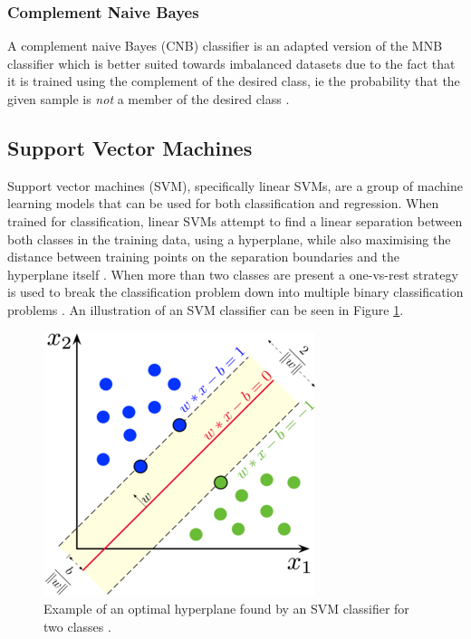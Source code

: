 \subsubsection{Complement Naive Bayes}

A complement naive Bayes (CNB) classifier is an adapted version of the MNB classifier which is better suited towards imbalanced datasets due to the fact that it is trained using the complement of the desired class, ie the probability that the given sample is \textit{not} a member of the desired class \cite{pedregosa2011scikit} \cite{rennie2003tackling}.

\subsection{Support Vector Machines}

Support vector machines (SVM), specifically linear SVMs, are a group of machine learning models that can be used for both classification and regression. When trained for classification, linear SVMs attempt to find a linear separation between both classes in the training data, using a hyperplane, while also maximising the distance between training points on the separation boundaries and the hyperplane itself \cite{dangeti2017statistics}. When more than two classes are present a one-vs-rest strategy is used to break the classification problem down into multiple binary classification problems \cite{pedregosa2011scikit}. An illustration of an SVM classifier can be seen in Figure \ref{fig:Explain_LSVC}.

\begin{figure}[ht]
    \centering
    \includegraphics[scale=4]{figures/99_explanations/01_LSVC.png}
    \caption{Example of an optimal hyperplane found by an SVM classifier for two classes \cite{WikipediaLSVC}.}
    \label{fig:Explain_LSVC}
\end{figure}

